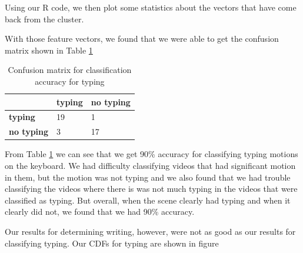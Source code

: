 Using our R code, we then plot some statistics about the vectors that have come
back from the cluster.

\FloatBarrier


With those feature vectors, we found that we were able to get the confusion matrix
shown in Table \ref{tab:typing_confusion}
\begin{table}[h]
  \begin{centering}
  \begin{tabular}{| l | l | l |}
  \hline
   & \textbf{typing} & \textbf{no typing}\\ \hline
  \textbf{typing} & 19 & 1 \\ \hline
  \textbf{no typing} & 3 & 17 \\ \hline
  \end{tabular}
  \caption{Confusion matrix for classification accuracy for typing}
  \label{tab:typing_confusion}
\end{centering}
\end{table}

\FloatBarrier

From Table \ref{tab:typing_confusion} we can see that we get 90\% accuracy for
classifying typing motions on the keyboard. We had difficulty classifying
videos that had significant motion in them, but the motion was not typing and
we also found that we had trouble classifying the videos where there is was
not much typing in the videos that were classified as typing. But overall, when the
scene clearly had typing and when it clearly did not, we found that we had
90\% accuracy.

Our results for determining writing, however, were not as good as our results
for classifying typing. Our CDFs for typing are shown in figure

